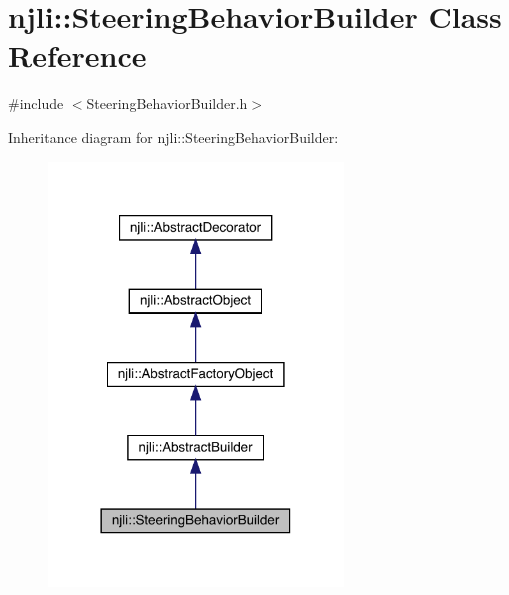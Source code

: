 \hypertarget{classnjli_1_1_steering_behavior_builder}{}\section{njli\+:\+:Steering\+Behavior\+Builder Class Reference}
\label{classnjli_1_1_steering_behavior_builder}


{\ttfamily \#include $<$Steering\+Behavior\+Builder.\+h$>$}



Inheritance diagram for njli\+:\+:Steering\+Behavior\+Builder\+:\nopagebreak
\begin{figure}[H]
\begin{center}
\leavevmode
\includegraphics[width=222pt]{classnjli_1_1_steering_behavior_builder__inherit__graph}
\end{center}
\end{figure}


